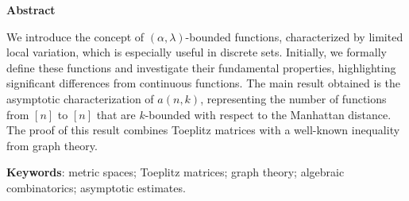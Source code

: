 \begin{center}
  \large \textbf{Abstract}
\end{center}
\vspace{1cm}
\par We introduce the concept of $(\alpha, \lambda)$-bounded functions, characterized by limited local variation, which is especially useful in discrete sets. Initially, we formally define these functions and investigate their fundamental properties, highlighting significant differences from continuous functions. The main result obtained is the asymptotic characterization of $a(n, k)$, representing the number of functions from $[n]$ to $[n]$ that are $k$-bounded with respect to the Manhattan distance. The proof of this result combines Toeplitz matrices with a well-known inequality from graph theory.

\vspace{1cm}

\begin{raggedleft}
  \textbf{Keywords}: metric spaces; Toeplitz matrices; graph theory; algebraic combinatorics; asymptotic estimates.
\end{raggedleft}
